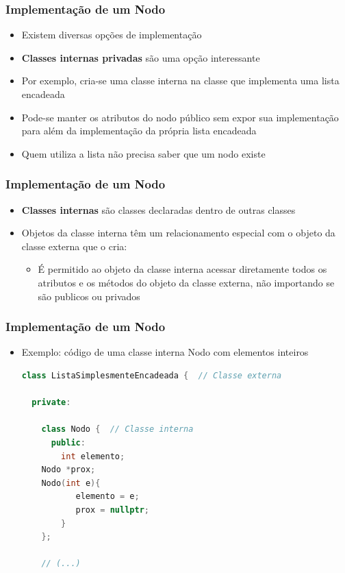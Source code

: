 \documentclass[aspectratio=169]{beamer}
\begin{document}
\begin{frame}\frametitle{Implementação de um Nodo}
\begin{itemize}
	\item Existem diversas opções de implementação
	\item \textbf{Classes internas privadas} são uma opção interessante
	\item Por exemplo, cria-se uma classe interna na classe que implementa uma lista encadeada
	\item Pode-se manter os atributos do nodo público sem expor sua implementação para além da implementação da própria lista encadeada
	\item Quem utiliza a lista não precisa saber que um nodo existe
\end{itemize}
\end{frame}

\begin{frame}\frametitle{Implementação de um Nodo}
\begin{itemize}
	\item \textbf{Classes internas} são classes declaradas dentro de outras classes
	\item Objetos da classe interna têm um relacionamento especial com o objeto da classe externa que o cria:
	\begin{itemize}
		\item É permitido ao objeto da classe interna acessar diretamente todos os atributos e os métodos do objeto da classe externa, não importando se são publicos ou privados
	\end{itemize}
\end{itemize}
\end{frame}

\begin{frame}[fragile]\frametitle{Implementação de um Nodo}
\begin{itemize}
	\item Exemplo: código de uma classe interna Nodo com elementos inteiros
\begin{lstlisting}[language=C++,basicstyle=\ttfamily\scriptsize]
class ListaSimplesmenteEncadeada {  // Classe externa

  private:

    class Nodo {  // Classe interna
      public:
        int elemento;
	Nodo *prox;
	Nodo(int e){
           elemento = e;
           prox = nullptr;
        }
    };

    // (...)
\end{lstlisting}
\end{itemize}
\end{frame}
\end{document}
